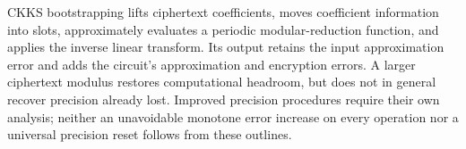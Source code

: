 CKKS bootstrapping lifts ciphertext coefficients, moves coefficient information into slots, approximately evaluates a periodic modular-reduction function, and applies the inverse linear transform. Its output retains the input approximation error and adds the circuit's approximation and encryption errors. A larger ciphertext modulus restores computational headroom, but does not in general recover precision already lost. Improved precision procedures require their own analysis; neither an unavoidable monotone error increase on every operation nor a universal precision reset follows from these outlines.
